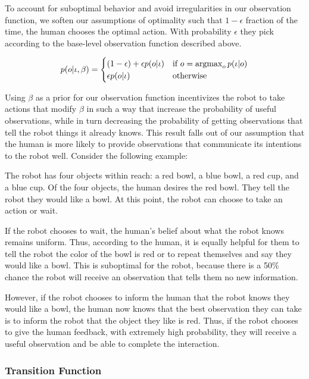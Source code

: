 \documentclass[conference]{IEEEtran}
\newcommand{\argmax}{\operatornamewithlimits{argmax}}
\begin{document}
To account for suboptimal behavior and avoid irregularities in our observation function, we soften our assumptions of optimality such that $1-\epsilon$ fraction of the time, the human chooses the optimal action. With probability $\epsilon$ they pick according to the base-level observation function described above. 

\begin{equation*} 
	p(o | \iota, \beta) = \begin{cases}
		(1-\epsilon) + \epsilon p(o|\iota) & \text{if } o = \argmax_o p(\iota|o) \\
		\epsilon p(o|\iota) & \text{otherwise}
	\end{cases}
\end{equation*}

Using $\beta$ as a prior for our observation function incentivizes the robot to take actions that modify $\beta$ in such a way that increase the probability of useful observations, while in turn decreasing the probability of getting observations that tell the robot things it already knows. This result falls out of our assumption that the human is more likely to provide observations that communicate its intentions to the robot well. Consider the following example: 

The robot has four objects within reach: a red bowl, a blue bowl, a red cup, and a blue cup. Of the four objects, the human desires the red bowl. They tell the robot they would like a bowl. At this point, the robot can choose to take an action or wait. 

If the robot chooses to wait, the human's belief about what the robot knows remains uniform. Thus, according to the human, it is equally helpful for them to tell the robot the color of the bowl is red or to repeat themselves and say they would like a bowl. This is suboptimal for the robot, because there is a 50\% chance the robot will receive an observation that tells them no new information. 

However, if the robot chooses to inform the human that the robot knows they would like a bowl, the human now knows that the best observation they can take is to inform the robot that the object they like is red. Thus, if the robot chooses to give the human feedback, with extremely high probability, they will receive a useful observation and be able to complete the interaction. 



\subsubsection{Transition Function} \label{sssec:tf}
\end{document}
